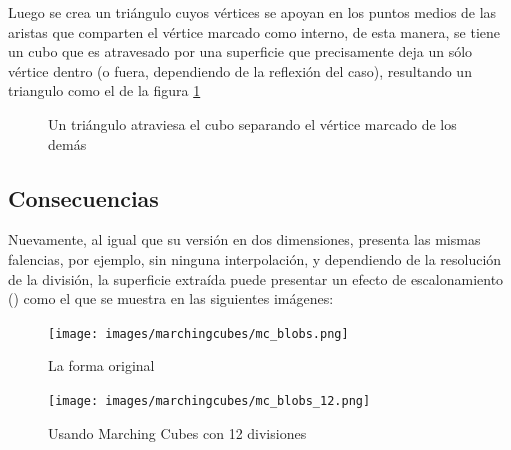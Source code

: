 Luego se crea un triángulo cuyos vértices se apoyan en los puntos medios de las aristas 
que comparten el vértice marcado como interno, de esta manera, se tiene un cubo que es 
atravesado por una superficie que precisamente deja un sólo vértice dentro (o fuera, dependiendo 
de la reflexión del caso), resultando un triangulo como el de la figura \ref{f:estadoDelArte:cube_03}

\begin{figure}[hbp]
\centering
\caption{Un triángulo atraviesa el cubo separando el vértice marcado de los demás}
\label{f:estadoDelArte:cube_03}
\end{figure}

\subsection{Consecuencias}
\label{subsec:marchingCubes:consecuencias}

Nuevamente, al igual que su versión en dos dimensiones, presenta las mismas falencias, 
por ejemplo, sin ninguna interpolación, y dependiendo de la resolución de la división, la 
superficie extraída puede presentar un efecto de escalonamiento () como el que se 
muestra en las siguientes imágenes:

\begin{figure}[hbp]
\centering
	\texttt{[image: images/marchingcubes/mc\_blobs.png]}
\caption{La forma original}
\label{f:estadoDelArte:mc_blobs}
\end{figure}

\begin{figure}[hbp]
\centering
	\texttt{[image: images/marchingcubes/mc\_blobs\_12.png]}
\caption{Usando Marching Cubes con 12 divisiones}
\label{f:estadoDelArte:mc_blobs_12}
\end{figure}

